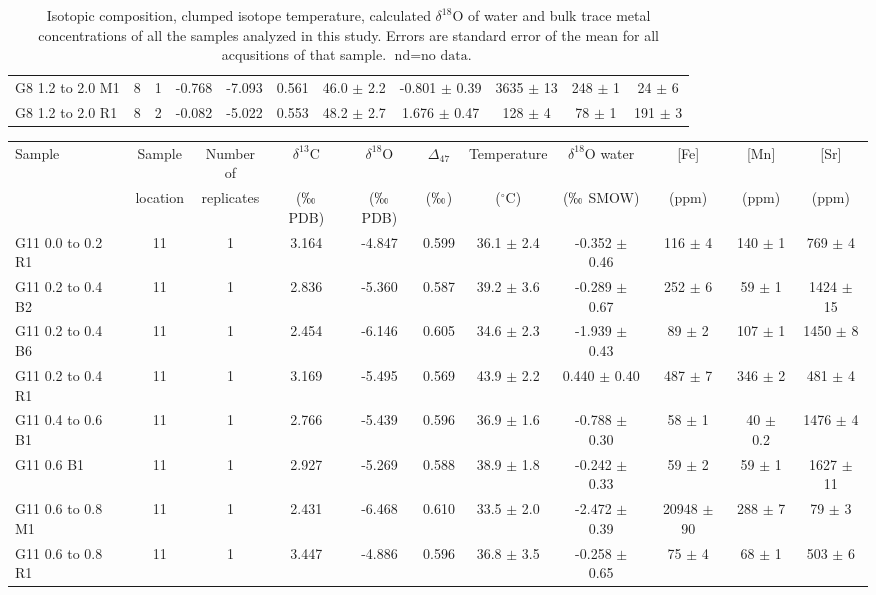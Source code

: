 \documentclass{article}
\newcommand{\deltao}{$\delta^{18}$}
\newcommand{\deltac}{$\delta^{13}$}
\newcommand{\degrees}{$^{\circ}$}
\begin{document}
\begin{sidewaystable}[htbp]
\begin{tabular}{ | l | c | c | c | c | c | c | c | c | c | c | }
G8 1.2 to 2.0 M1 & 8 & 1 & -0.768 & -7.093 & 0.561 & 46.0 $\pm$ 2.2 & -0.801 $\pm$ 0.39 & 3635 $\pm$ 13 & 248 $\pm$ 1 & 24 $\pm$ 6 \\
G8 1.2 to 2.0 R1 & 8 & 2 & -0.082 & -5.022 & 0.553 & 48.2 $\pm$ 2.7 & 1.676 $\pm$ 0.47 & 128 $\pm$ 4 & 78 $\pm$ 1 & 191 $\pm$ 3 \\
\end{tabular} 
\caption{Isotopic composition, clumped isotope temperature, calculated \deltao O of water and bulk trace metal concentrations of all the samples analyzed in this study. Errors are standard error of the mean for all acqusitions of that sample. $\text{nd}=\text{no data.}$}
\label{results}
\end{sidewaystable}

\begin{sidewaystable}[htbp]
\centering
\small
\begin{tabular}{ | l | c | c | c | c | c | c | c | c | c | c | }
\multirow{2}{*}{Sample} & Sample & Number of & \deltac C & \deltao O & $\Delta_{47}$ & Temperature & \deltao O water & [Fe] & [Mn] & [Sr] \\
 & location & replicates & ($\permil$ PDB) & ($\permil$ PDB) & ($\permil$) & (\degrees C) & ($\permil$ SMOW) & (ppm) & (ppm) & (ppm)\\ \hline
G11 0.0 to 0.2 R1 & 11 & 1 & 3.164 & -4.847 & 0.599 & 36.1 $\pm$ 2.4 & -0.352 $\pm$ 0.46 & 116 $\pm$ 4 & 140 $\pm$ 1 & 769 $\pm$ 4 \\
G11 0.2 to 0.4 B2 & 11 & 1 & 2.836 & -5.360 & 0.587 & 39.2 $\pm$ 3.6 & -0.289 $\pm$ 0.67 & 252 $\pm$ 6 & 59 $\pm$ 1 & 1424 $\pm$ 15 \\
G11 0.2 to 0.4 B6 & 11 & 1 & 2.454 & -6.146 & 0.605 & 34.6 $\pm$ 2.3 & -1.939 $\pm$ 0.43 & 89 $\pm$ 2 & 107 $\pm$ 1 & 1450 $\pm$ 8 \\
G11 0.2 to 0.4 R1 & 11 & 1 & 3.169 & -5.495 & 0.569 & 43.9 $\pm$ 2.2 & 0.440 $\pm$ 0.40 & 487 $\pm$ 7 & 346 $\pm$ 2 & 481 $\pm$ 4 \\
G11 0.4 to 0.6 B1 & 11 & 1 & 2.766 & -5.439 & 0.596 & 36.9 $\pm$ 1.6 & -0.788 $\pm$ 0.30 & 58 $\pm$ 1 & 40 $\pm$ 0.2 & 1476 $\pm$ 4 \\
G11 0.6 B1 & 11 & 1 & 2.927 & -5.269 & 0.588 & 38.9 $\pm$ 1.8 & -0.242 $\pm$ 0.33 & 59 $\pm$ 2 & 59 $\pm$ 1 & 1627 $\pm$ 11 \\
G11 0.6 to 0.8 M1 & 11 & 1 & 2.431 & -6.468 & 0.610 & 33.5 $\pm$ 2.0 & -2.472 $\pm$ 0.39 & 20948 $\pm$ 90 & 288 $\pm$ 7 & 79 $\pm$ 3 \\
G11 0.6 to 0.8 R1 & 11 & 1 & 3.447 & -4.886 & 0.596 & 36.8 $\pm$ 3.5 & -0.258 $\pm$ 0.65 & 75 $\pm$ 4 & 68 $\pm$ 1 & 503 $\pm$ 6 \\

\end{tabular}
\end{sidewaystable}
\end{document}
